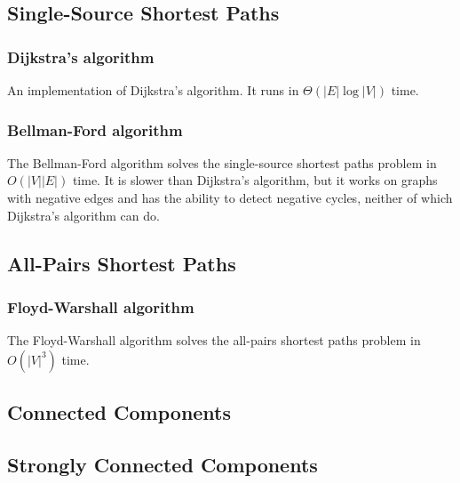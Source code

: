 \documentclass[8pt,a4paper]{amsart}
\begin{document}

\subsection{Single-Source Shortest Paths}
\subsubsection{Dijkstra's algorithm}
An implementation of Dijkstra's algorithm. It runs in $\Theta(|E|\log{|V|})$ time.


\subsubsection{Bellman-Ford algorithm}
The Bellman-Ford algorithm solves the single-source shortest paths problem in $O(|V||E|)$ time. It is slower than Dijkstra's algorithm, but it works on graphs with negative edges and has the ability to detect negative cycles, neither of which Dijkstra's algorithm can do.

\subsection{All-Pairs Shortest Paths}
\subsubsection{Floyd-Warshall algorithm}
The Floyd-Warshall algorithm solves the all-pairs shortest paths problem in $O(|V|^3)$ time.

\subsection{Connected Components}
\subsection{Strongly Connected Components}
\end{document}
